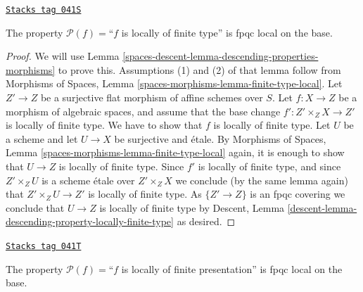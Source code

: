 \begin{lemma}
\label{spaces-descent-lemma-descending-property-locally-finite-type}
\href{https://stacks.math.columbia.edu/tag/041S}{\texttt{Stacks tag 041S}}

The property $\mathcal{P}(f) =$``$f$ is locally of finite type''
is fpqc local on the base.
\end{lemma}

\begin{proof}
We will use
Lemma \ref{spaces-descent-lemma-descending-properties-morphisms}
to prove this. Assumptions (1) and (2) of that lemma follow from
Morphisms of Spaces,
Lemma \ref{spaces-morphisms-lemma-finite-type-local}.
Let $Z' \to Z$ be a surjective flat morphism of affine schemes over $S$.
Let $f : X \to Z$ be a morphism of algebraic spaces, and assume
that the base change $f' : Z' \times_Z X \to Z'$ is locally of finite type.
We have to show that $f$ is locally of finite type. Let $U$ be a scheme
and let $U \to X$ be surjective and \'etale. By
Morphisms of Spaces,
Lemma \ref{spaces-morphisms-lemma-finite-type-local}
again, it is enough to show that $U \to Z$ is locally of finite type.
Since $f'$ is locally of finite type, and since $Z' \times_Z U$ is a
scheme \'etale over $Z' \times_Z X$ we conclude (by the same lemma again) that
$Z' \times_Z U \to Z'$ is locally of finite type.
As $\{Z' \to Z\}$ is an fpqc covering we conclude that
$U \to Z$ is locally of finite type by
Descent, Lemma \ref{descent-lemma-descending-property-locally-finite-type}
as desired.
\end{proof}

\begin{lemma}
\label{spaces-descent-lemma-descending-property-locally-finite-presentation}
\href{https://stacks.math.columbia.edu/tag/041T}{\texttt{Stacks tag 041T}}

The property $\mathcal{P}(f) =$``$f$ is locally of finite presentation''
is fpqc local on the base.
\end{lemma}

